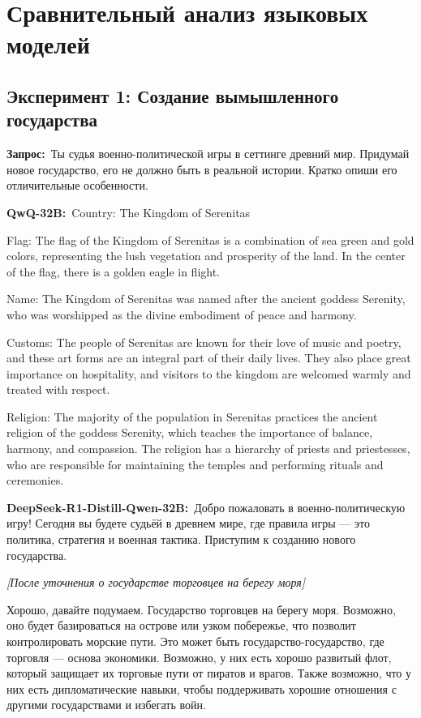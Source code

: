 \section*{Сравнительный анализ языковых моделей}

\subsection*{Эксперимент 1: Создание вымышленного государства}

\textbf{Запрос:}\
Ты судья военно-политической игры в сеттинге древний мир. Придумай новое государство, его не должно быть в реальной истории. Кратко опиши его отличительные особенности.\

\textbf{QwQ-32B:}\
Country: The Kingdom of Serenitas

Flag: The flag of the Kingdom of Serenitas is a combination of sea green and gold colors, representing the lush vegetation and prosperity of the land. In the center of the flag, there is a golden eagle in flight.

Name: The Kingdom of Serenitas was named after the ancient goddess Serenity, who was worshipped as the divine embodiment of peace and harmony.

Customs: The people of Serenitas are known for their love of music and poetry, and these art forms are an integral part of their daily lives. They also place great importance on hospitality, and visitors to the kingdom are welcomed warmly and treated with respect.

Religion: The majority of the population in Serenitas practices the ancient religion of the goddess Serenity, which teaches the importance of balance, harmony, and compassion. The religion has a hierarchy of priests and priestesses, who are responsible for maintaining the temples and performing rituals and ceremonies.\

\textbf{DeepSeek-R1-Distill-Qwen-32B:}\
Добро пожаловать в военно-политическую игру! Сегодня вы будете судьёй в древнем мире, где правила игры — это политика, стратегия и военная тактика. Приступим к созданию нового государства.

\textit{[После уточнения о государстве торговцев на берегу моря]}

Хорошо, давайте подумаем. Государство торговцев на берегу моря. Возможно, оно будет базироваться на острове или узком побережье, что позволит контролировать морские пути. Это может быть государство-государство, где торговля — основа экономики. Возможно, у них есть хорошо развитый флот, который защищает их торговые пути от пиратов и врагов. Также возможно, что у них есть дипломатические навыки, чтобы поддерживать хорошие отношения с другими государствами и избегать войн.\


